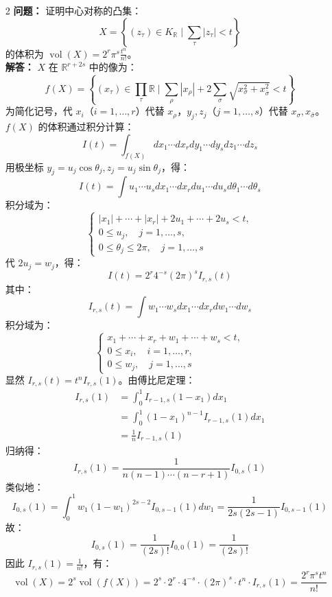 \documentclass[UTF8]{ctexart}
\begin{document}
\begin{enumerate}
\begin{enumerate}
\item[2] 
\textbf{问题：} 证明中心对称的凸集：
\[
X = \left\{(z_\tau) \in K_{\mathbb{R}} \mid \sum_\tau |z_\tau| < t\right\}
\]
的体积为 \(\operatorname{vol}(X) = 2^r \pi^s \frac{t^n}{n!}\)。\\
\textbf{解答：} \(X\) 在 \(\mathbb{R}^{r+2s}\) 中的像为：
\[
f(X) = \left\{(x_\tau) \in \prod_\tau \mathbb{R} \mid \sum_\rho |x_\rho| + 2 \sum_\sigma \sqrt{x_\sigma^2 + x_{\bar{\sigma}}^2} < t\right\}
\]
为简化记号，代 \(x_i\)（\(i = 1, \dots, r\)）代替 \(x_\rho\)，\(y_j, z_j\)（\(j = 1, \dots, s\)）代替 \(x_\sigma, x_{\bar{\sigma}}\)。\(f(X)\) 的体积通过积分计算：
\[
I(t) = \int_{f(X)} dx_1 \cdots dx_r dy_1 \cdots dy_s dz_1 \cdots dz_s
\]
用极坐标 \(y_j = u_j \cos \theta_j, z_j = u_j \sin \theta_j\)，得：
\[
I(t) = \int u_1 \cdots u_s dx_1 \cdots dx_r du_1 \cdots du_s d\theta_1 \cdots d\theta_s
\]
积分域为：
\[
\begin{cases}
|x_1| + \cdots + |x_r| + 2u_1 + \cdots + 2u_s < t, \\
0 \leq u_j, \quad j = 1, \dots, s, \\
0 \leq \theta_j \leq 2\pi, \quad j = 1, \dots, s
\end{cases}
\]
代 \(2u_j = w_j\)，得：
\[
I(t) = 2^r 4^{-s} (2\pi)^s I_{r,s}(t)
\]
其中：
\[
I_{r,s}(t) = \int w_1 \cdots w_s dx_1 \cdots dx_r dw_1 \cdots dw_s
\]
积分域为：
\[
\begin{cases}
x_1 + \cdots + x_r + w_1 + \cdots + w_s < t, \\
0 \leq x_i, \quad i = 1, \dots, r, \\
0 \leq w_j, \quad j = 1, \dots, s
\end{cases}
\]
显然 \(I_{r,s}(t) = t^n I_{r,s}(1)\)。由傅比尼定理：
\[
\begin{aligned}
I_{r,s}(1) &= \int_0^1 I_{r-1,s}(1 - x_1) dx_1 \\
&= \int_0^1 (1 - x_1)^{n-1} I_{r-1,s}(1) dx_1 \\
&= \frac{1}{n} I_{r-1,s}(1)
\end{aligned}
\]
归纳得：
\[
I_{r,s}(1) = \frac{1}{n(n-1) \cdots (n-r+1)} I_{0,s}(1)
\]
类似地：
\[
I_{0,s}(1) = \int_0^1 w_1 (1 - w_1)^{2s-2} I_{0,s-1}(1) dw_1 = \frac{1}{2s(2s-1)} I_{0,s-1}(1)
\]
故：
\[
I_{0,s}(1) = \frac{1}{(2s)!} I_{0,0}(1) = \frac{1}{(2s)!}
\]
因此 \(I_{r,s}(1) = \frac{1}{n!}\)，有：
\[
\operatorname{vol}(X) = 2^s \operatorname{vol}(f(X)) = 2^s \cdot 2^r \cdot 4^{-s} \cdot (2\pi)^s \cdot t^n \cdot I_{r,s}(1) = \frac{2^r \pi^s t^n}{n!}
\]


\end{enumerate}
\end{enumerate}
\end{document}
